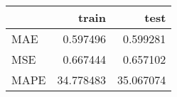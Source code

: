 \begin{tabular}{lrr}
\toprule
{} &      train &       test \\
\midrule
MAE  &   0.597496 &   0.599281 \\
MSE  &   0.667444 &   0.657102 \\
MAPE &  34.778483 &  35.067074 \\
\bottomrule
\end{tabular}
